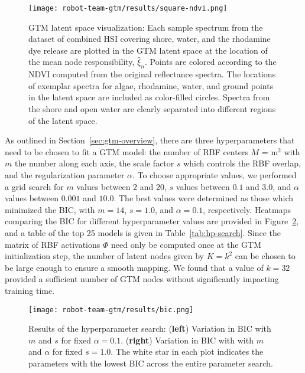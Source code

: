 \begin{figure}[H]
  \vspace{-0.25cm}
  \centering
  \texttt{[image: robot-team-gtm/results/square-ndvi.png]}
  \vspace{-0.75cm}
  \caption{GTM latent space visualization: Each sample spectrum from the dataset
    of combined HSI covering shore, water, and the rhodamine dye release are
    plotted in the GTM latent space at the location of the mean node
    responsibility, $\hat{\xi}_n$. Points are colored according to the NDVI
    computed from the original reflectance spectra. The locations of exemplar
    spectra for algae, rhodamine, water, and ground points in the latent space
    are included as color-filled circles. Spectra from the shore and open water
    are clearly separated into different regions of the latent
    space.}
  \label{fig:gtm-ndvi}
\end{figure}



As outlined in Section~\ref{sec:gtm-overview}, there are three hyperparameters
that need to be chosen to fit a GTM model: the number of RBF centers $M$ = m$^2$
with $m$ the number along each axis, the scale factor $s$ which controls the RBF
overlap, and the regularization parameter $\alpha$. To choose appropriate
values, we performed a grid search for $m$ values between $2$ and $20$, $s$
values between $0.1$ and $3.0$, and $\alpha$ values between $0.001$ and $10.0$.
The best values were determined as those which minimized the BIC, with $m=14$,
$s=1.0$, and $\alpha=0.1$, respectively. Heatmaps comparing the BIC for
different hyperparameter values are provided in Figure~\ref{fig:hp-results}, and
a table of the top 25 models is given in Table~\ref{tab:hp-search}.  Since the
matrix of RBF activations $\Phi$ need only be computed once at the GTM
initialization step, the number of latent nodes given by $K=k^2$ can be chosen
to be large enough to ensure a smooth mapping. We found that a value of $k=32$
provided a sufficient number of GTM nodes without significantly impacting
training time.

\begin{figure}[H]
  \centering
  \texttt{[image: robot-team-gtm/results/bic.png]}
  \caption{Results of the hyperparameter search: (\textbf{left}) Variation in
    BIC with $m$ and $s$ for fixed $\alpha=0.1$. (\textbf{right}) Variation in
    BIC with with $m$ and $\alpha$ for fixed $s=1.0$. The white star in each
    plot indicates the parameters with the lowest BIC across the entire
    parameter search.}
  \label{fig:hp-results}
\end{figure}


